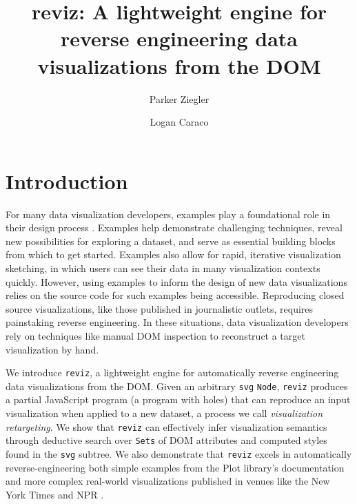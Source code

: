 \documentclass[acmsmall,screen,nonacm]{acmart}
\newcommand{\code}[1]{\texttt{#1}}
\begin{document}
\title{reviz: A lightweight engine for reverse engineering data visualizations from the DOM}

\author{Parker Ziegler}

\author{Logan Caraco}

\maketitle

\section{Introduction}

For many data visualization developers, examples play a foundational role in their design process \cite{bostock:2021,bostock:2013}. Examples help demonstrate challenging techniques, reveal new possibilities for exploring a dataset, and serve as essential building blocks from which to get started. Examples also allow for rapid, iterative visualization sketching, in which users can see their data in many visualization contexts quickly. However, using examples to inform the design of new data visualizations relies on the source code for such examples being accessible. Reproducing closed source visualizations, like those published in journalistic outlets, requires painstaking reverse engineering. In these situations, data visualization developers rely on techniques like manual DOM inspection to reconstruct a target visualization by hand.

We introduce \code{reviz}, a lightweight engine for automatically reverse engineering data visualizations from the DOM. Given an arbitrary \code{svg} \code{Node}, \code{reviz} produces a partial JavaScript program (a program with holes) that can reproduce an input visualization when applied to a new dataset, a process we call \emph{visualization retargeting}. We show that \code{reviz} can effectively infer visualization semantics through deductive search over \code{Sets} of DOM attributes and computed styles found in the \code{svg} subtree. We also demonstrate that \code{reviz} excels in automatically reverse-engineering both simple examples from the Plot library's documentation \cite{observable_plot_docs:2021} and more complex real-world visualizations published in venues like the New York Times \cite{ivory_nyt:2021} and NPR \cite{mcminn_npr:2020}.
\end{document}
